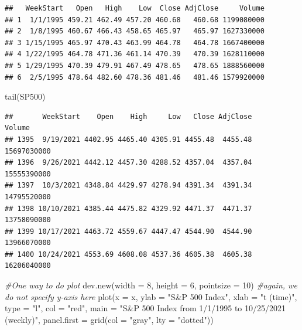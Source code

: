 \documentclass[
]{book}
\newenvironment{Shaded}{\begin{snugshade}}{\end{snugshade}}
\newcommand{\AttributeTok}[1]{\textcolor[rgb]{0.77,0.63,0.00}{#1}}
\newcommand{\CommentTok}[1]{\textcolor[rgb]{0.56,0.35,0.01}{\textit{#1}}}
\newcommand{\DecValTok}[1]{\textcolor[rgb]{0.00,0.00,0.81}{#1}}
\newcommand{\FunctionTok}[1]{\textcolor[rgb]{0.00,0.00,0.00}{#1}}
\newcommand{\NormalTok}[1]{#1}
\newcommand{\OtherTok}[1]{\textcolor[rgb]{0.56,0.35,0.01}{#1}}
\newcommand{\SpecialCharTok}[1]{\textcolor[rgb]{0.00,0.00,0.00}{#1}}
\newcommand{\StringTok}[1]{\textcolor[rgb]{0.31,0.60,0.02}{#1}}
\theoremstyle{definition}
\theoremstyle{definition}
\theoremstyle{definition}
\theoremstyle{definition}
\theoremstyle{remark}
\begin{document}
\begin{verbatim}
##   WeekStart   Open   High    Low  Close AdjClose     Volume
## 1  1/1/1995 459.21 462.49 457.20 460.68   460.68 1199080000
## 2  1/8/1995 460.67 466.43 458.65 465.97   465.97 1627330000
## 3 1/15/1995 465.97 470.43 463.99 464.78   464.78 1667400000
## 4 1/22/1995 464.78 471.36 461.14 470.39   470.39 1628110000
## 5 1/29/1995 470.39 479.91 467.49 478.65   478.65 1888560000
## 6  2/5/1995 478.64 482.60 478.36 481.46   481.46 1579920000
\end{verbatim}

\begin{Shaded}
\begin{Highlighting}[]
\FunctionTok{tail}\NormalTok{(SP500)}
\end{Highlighting}
\end{Shaded}

\begin{verbatim}
##       WeekStart    Open    High     Low   Close AdjClose      Volume
## 1395  9/19/2021 4402.95 4465.40 4305.91 4455.48  4455.48 15697030000
## 1396  9/26/2021 4442.12 4457.30 4288.52 4357.04  4357.04 15555390000
## 1397  10/3/2021 4348.84 4429.97 4278.94 4391.34  4391.34 14795520000
## 1398 10/10/2021 4385.44 4475.82 4329.92 4471.37  4471.37 13758090000
## 1399 10/17/2021 4463.72 4559.67 4447.47 4544.90  4544.90 13966070000
## 1400 10/24/2021 4553.69 4608.08 4537.36 4605.38  4605.38 16206040000
\end{verbatim}

\begin{Shaded}
\end{Shaded}

\begin{Shaded}
\begin{Highlighting}[]
\CommentTok{\#One way to do plot}
\FunctionTok{dev.new}\NormalTok{(}\AttributeTok{width =} \DecValTok{8}\NormalTok{, }\AttributeTok{height =} \DecValTok{6}\NormalTok{, }\AttributeTok{pointsize =} \DecValTok{10}\NormalTok{) }
\CommentTok{\#again, we do not specify y{-}axis here}
\FunctionTok{plot}\NormalTok{(}\AttributeTok{x =}\NormalTok{ x, }\AttributeTok{ylab =} \StringTok{"S\&P 500 Index"}\NormalTok{, }\AttributeTok{xlab =} \StringTok{"t (time)"}\NormalTok{, }
    \AttributeTok{type =} \StringTok{"l"}\NormalTok{, }\AttributeTok{col =} \StringTok{"red"}\NormalTok{, }\AttributeTok{main =} \StringTok{"S\&P 500 Index from }
\StringTok{    1/1/1995 to 10/25/2021 (weekly)"}\NormalTok{, }
    \AttributeTok{panel.first =} \FunctionTok{grid}\NormalTok{(}\AttributeTok{col =} \StringTok{"gray"}\NormalTok{, }\AttributeTok{lty =} \StringTok{"dotted"}\NormalTok{))}
\end{Highlighting}
\end{Shaded}
\end{document}
